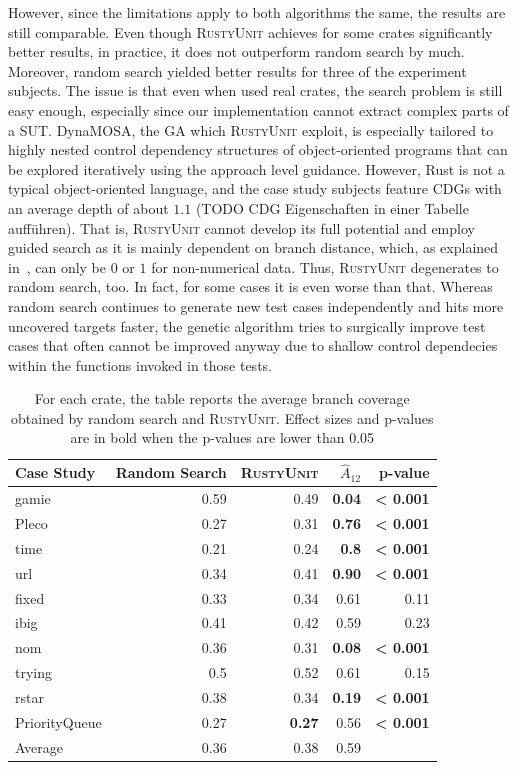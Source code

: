 \documentclass[paper=a4,%
  twoside,%
  BCOR4mm,%
  abstract=true,%
  toc=bibliography,%
  chapterprefix=true,%
  toc=bibliographynumbered,%
  open=right,%
  english,%
  pagesize=pdftex]{scrreprt}
\newcommand{\tech}{\textsc{RustyUnit}\xspace}
\newcommand{\sut}{\ac{SUT}\xspace}
\begin{document}
However, since the limitations apply to both algorithms the same, the results are still comparable. Even though \tech achieves for some crates significantly better results, in practice, it does not outperform random search by much. Moreover, random search yielded better results for three of the experiment subjects. The issue is that even when used real crates, the search problem is still easy enough, especially since our implementation cannot extract complex parts of a \sut. \ac{DynaMOSA}, the \ac{GA} which \tech exploit, is especially tailored to highly nested control dependency structures of object-oriented programs that can be explored iteratively using the approach level guidance. However, Rust is not a typical object-oriented language, and the case study subjects feature \acp{CDG} with an average depth of about $1.1$ (TODO CDG Eigenschaften in einer Tabelle aufführen). That is, \tech cannot develop its full potential and employ guided search as it is mainly dependent on branch distance, which, as explained in~, can only be $0$ or $1$ for non-numerical data. Thus, \tech degenerates to random search, too. In fact, for some cases it is even worse than that. Whereas random search continues to generate new test cases independently and hits more uncovered targets faster, the genetic algorithm tries to surgically improve test cases that often cannot be improved anyway due to shallow control dependecies within the functions invoked in those tests. 



\begin{table}[]
  \begin{tabular*}{\textwidth}{l @{\extracolsep{\fill}} rrrr}
  \hline
  \textbf{Case Study} & Random Search & \tech & \textbf{$\hat{A}_{12}$} & p-value \\
  \hline
  gamie & 0.59 & 0.49 & \textbf{0.04} & \textbf{< 0.001} \\
  Pleco & 0.27 & 0.31 & \textbf{0.76} & \textbf{< 0.001} \\
  time & 0.21 & 0.24 & \textbf{0.8} & \textbf{< 0.001} \\
  url & 0.34 & 0.41 & \textbf{0.90} & \textbf{< 0.001} \\
  fixed & 0.33 & 0.34 & 0.61 & 0.11 \\
  ibig & 0.41 & 0.42 & 0.59 & 0.23 \\
  nom & 0.36 & 0.31 & \textbf{0.08} & \textbf{< 0.001} \\
  trying & 0.5 & 0.52 & 0.61 & 0.15 \\
  rstar & 0.38 & 0.34 & \textbf{0.19} & \textbf{< 0.001} \\
  PriorityQueue & 0.27 & \textbf{0.27} & 0.56 & \textbf{< 0.001} \\
  \hline
  Average & 0.36 & 0.38 & 0.59 & \\
  \hline
  \end{tabular*}
\caption{\label{tab:results-ru-rs-coverage}For each crate, the table reports the average branch coverage obtained by random search and \tech. Effect sizes and p-values are in bold when the p-values are lower than 0.05}
\end{table}
\end{document}
